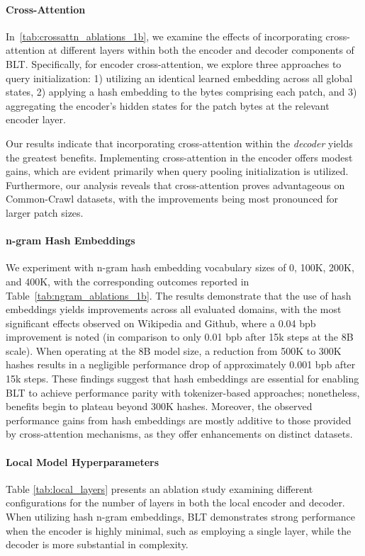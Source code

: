 \paragraph{Cross-Attention}
In~\autoref{tab:crossattn_ablations_1b}, we examine the effects of incorporating cross-attention at different layers within both the encoder and decoder components of {\textsc BLT}. Specifically, for encoder cross-attention, we explore three approaches to query initialization: 1) utilizing an identical learned embedding across all global states, 2) applying a hash embedding to the bytes comprising each patch, and 3) aggregating the encoder’s hidden states for the patch bytes at the relevant encoder layer.

Our results indicate that incorporating cross-attention within the \textit{decoder} yields the greatest benefits. Implementing cross-attention in the encoder offers modest gains, which are evident primarily when query pooling initialization is utilized. Furthermore, our analysis reveals that cross-attention proves advantageous on Common-Crawl datasets, with the improvements being most pronounced for larger patch sizes.

\paragraph{n-gram Hash Embeddings} 

We experiment with n-gram hash embedding vocabulary sizes of 0, 100K, 200K, and 400K, with the corresponding outcomes reported in Table~\ref{tab:ngram_ablations_1b}. The results demonstrate that the use of hash embeddings yields improvements across all evaluated domains, with the most significant effects observed on Wikipedia and Github, where a 0.04 bpb improvement is noted (in comparison to only 0.01 bpb after 15k steps at the 8B scale). When operating at the 8B model size, a reduction from 500K to 300K hashes results in a negligible performance drop of approximately 0.001 bpb after 15k steps. These findings suggest that hash embeddings are essential for enabling {\textsc BLT} to achieve performance parity with tokenizer-based approaches; nonetheless, benefits begin to plateau beyond 300K hashes. Moreover, the observed performance gains from hash embeddings are mostly additive to those provided by cross-attention mechanisms, as they offer enhancements on distinct datasets.

\paragraph{Local Model Hyperparameters} Table \ref{tab:local_layers} presents an ablation study examining different configurations for the number of layers in both the local encoder and decoder. When utilizing hash n-gram embeddings, {\textsc BLT} demonstrates strong performance when the encoder is highly minimal, such as employing a single layer, while the decoder is more substantial in complexity.


